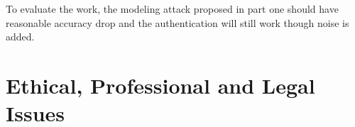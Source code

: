 To evaluate the work, the modeling attack proposed in part one should have reasonable accuracy drop and the authentication will still work though noise is added.



\section{Ethical, Professional and Legal Issues}


